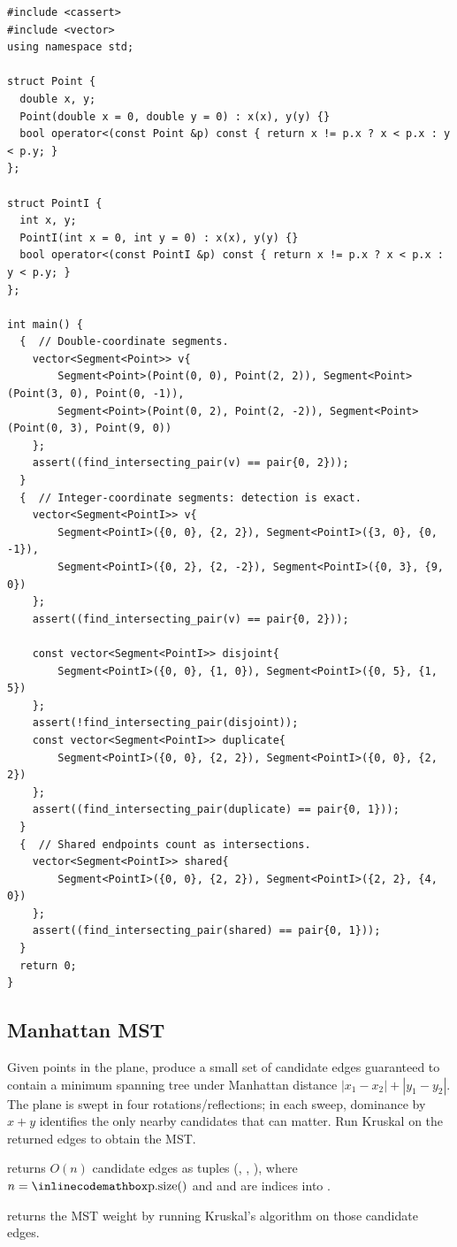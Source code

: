 \begin{lstlisting}[style=cpp]
#include <cassert>
#include <vector>
using namespace std;

struct Point {
  double x, y;
  Point(double x = 0, double y = 0) : x(x), y(y) {}
  bool operator<(const Point &p) const { return x != p.x ? x < p.x : y < p.y; }
};

struct PointI {
  int x, y;
  PointI(int x = 0, int y = 0) : x(x), y(y) {}
  bool operator<(const PointI &p) const { return x != p.x ? x < p.x : y < p.y; }
};

int main() {
  {  // Double-coordinate segments.
    vector<Segment<Point>> v{
        Segment<Point>(Point(0, 0), Point(2, 2)), Segment<Point>(Point(3, 0), Point(0, -1)),
        Segment<Point>(Point(0, 2), Point(2, -2)), Segment<Point>(Point(0, 3), Point(9, 0))
    };
    assert((find_intersecting_pair(v) == pair{0, 2}));
  }
  {  // Integer-coordinate segments: detection is exact.
    vector<Segment<PointI>> v{
        Segment<PointI>({0, 0}, {2, 2}), Segment<PointI>({3, 0}, {0, -1}),
        Segment<PointI>({0, 2}, {2, -2}), Segment<PointI>({0, 3}, {9, 0})
    };
    assert((find_intersecting_pair(v) == pair{0, 2}));

    const vector<Segment<PointI>> disjoint{
        Segment<PointI>({0, 0}, {1, 0}), Segment<PointI>({0, 5}, {1, 5})
    };
    assert(!find_intersecting_pair(disjoint));
    const vector<Segment<PointI>> duplicate{
        Segment<PointI>({0, 0}, {2, 2}), Segment<PointI>({0, 0}, {2, 2})
    };
    assert((find_intersecting_pair(duplicate) == pair{0, 1}));
  }
  {  // Shared endpoints count as intersections.
    vector<Segment<PointI>> shared{
        Segment<PointI>({0, 0}, {2, 2}), Segment<PointI>({2, 2}, {4, 0})
    };
    assert((find_intersecting_pair(shared) == pair{0, 1}));
  }
  return 0;
}
\end{lstlisting}
\subsection{Manhattan MST}
\label{sec:7.3.11}
Given points in the plane, produce a small set of candidate edges guaranteed to contain a minimum spanning tree under Manhattan distance $|x_1 - x_2| + |y_1 - y_2|$. The plane is swept in four rotations/reflections; in each sweep, dominance by $x + y$ identifies the only nearby candidates that can matter. Run Kruskal on the returned edges to obtain the MST.

\begin{compactitem}
  \item {} returns $O(n)$ candidate edges as tuples (, , ), where $n = {\inlinecodemath{p.size()}}$ and  and  are indices into .
  \item {} returns the MST weight by running Kruskal's algorithm on those candidate edges.
\end{compactitem}

